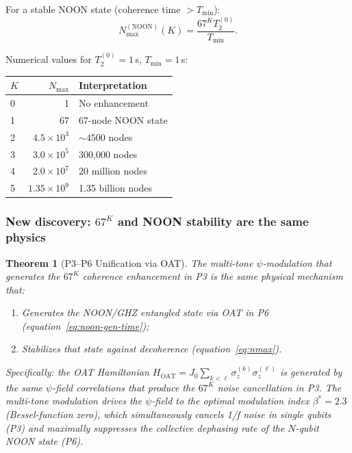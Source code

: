 \documentclass[11pt]{article}
\newtheorem{theorem}{Theorem}[section]
\theoremstyle{definition}
\theoremstyle{remark}
\begin{document}
For a stable NOON state (coherence time $> T_{\min}$):
\begin{equation}
\boxed{N_{\max}^{(\mathrm{NOON})}(K) = \frac{67^K T_2^{(0)}}{T_{\min}}.}
\label{eq:nmax}
\end{equation}

Numerical values for $T_2^{(0)} = 1$\,s, $T_{\min} = 1$\,s:
\begin{center}
\begin{tabular}{lrl}
\toprule
$K$ & $N_{\max}$ & Interpretation \\
\midrule
0 & 1 & No enhancement \\
1 & 67 & 67-node NOON state \\
2 & $4.5\times10^3$ & $\sim 4500$ nodes \\
3 & $3.0\times10^5$ & 300,000 nodes \\
4 & $2.0\times10^7$ & 20 million nodes \\
5 & $1.35\times10^9$ & 1.35 billion nodes \\
\bottomrule
\end{tabular}
\end{center}

\subsubsection{New discovery: $67^K$ and NOON stability are the same physics}

\begin{theorem}[P3--P6 Unification via OAT]
The multi-tone $\psi$-modulation that generates the $67^K$ coherence
enhancement in P3 is the same physical mechanism that:
\begin{enumerate}
\item Generates the NOON/GHZ entangled state via OAT in P6
  (equation~\eqref{eq:noon-gen-time});
\item Stabilizes that state against decoherence
  (equation~\eqref{eq:nmax}).
\end{enumerate}

Specifically: the OAT Hamiltonian $H_{\mathrm{OAT}} = J_0 \sum_{k<\ell}\sigma_z^{(k)}\sigma_z^{(\ell)}$
is generated by the same $\psi$-field correlations that produce the
$67^K$ noise cancellation in P3. The multi-tone modulation drives the
$\psi$-field to the optimal modulation index $\beta^* = 2.3$
(Bessel-function zero), which simultaneously cancels 1/f noise in
single qubits (P3) and maximally suppresses the collective dephasing
rate of the $N$-qubit NOON state (P6).
\end{theorem}
\end{document}
